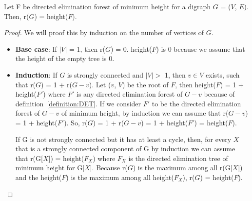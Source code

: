 \begin{lemma}
Let F be directed elimination forest of minimum height for a digraph $G$ = ($V$, $E$). Then, r($G$) = height($F$). 
\end{lemma}
\begin{proof}
We will proof this by induction on the number of vertices of $G$.
\begin{itemize}
  \item \textbf{Base case}: If $|V|$ = 1, then r($G$) = 0. height($F$) is 0 because we assume that the height of the empty tree is 0.
  \item \textbf{Induction}: If $G$ is strongly connected and $|V| >$ 1, then $v \in V$ exists, such that r($G$) = 1 + r($G-v$). Let ($v$, $V$) be the root of $F$, then height($F$) = 1 + height($F'$) where $F'$ is any directed elimination forest of $G-v$ because of definition~\ref{definition:DET}. If we consider $F'$ to be the directed elimination forest of $G-v$ of minimum height, by induction we can assume that r($G-v$) = 1 + height($F'$). So, r($G$) = 1 + r($G-v$) = 1 + height($F'$) = height($F$).
  
  If G is not strongly connected but it has at least a cycle, then, for every $X$ that is a strongly connected component of G by induction we can assume that r(G[$X$]) = height($F_X$) where $F_X$ is the directed elimination tree of minimum height for G[$X$]. Because r($G$) is the maximum among all r(G[$X$]) and the height($F$) is the maximum among all height($F_X$), r($G$) = height($F$).
\end{itemize}
\end{proof}